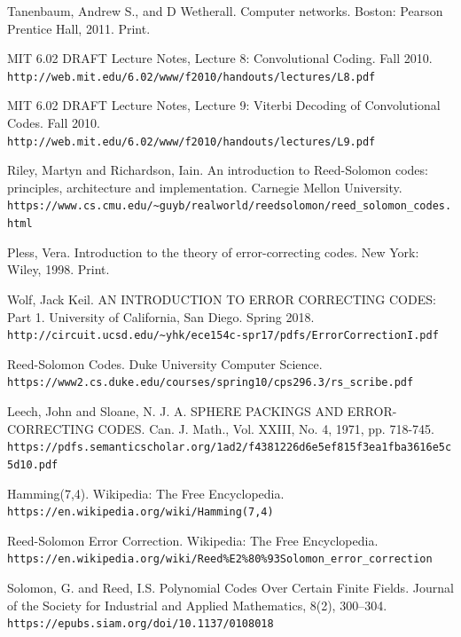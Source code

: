 \documentclass[12pt]{article}
\begin{document}
\begin{thebibliography}{9}

Tanenbaum, Andrew S., and D Wetherall. Computer networks. Boston: Pearson Prentice Hall, 2011. Print.
 
MIT 6.02 DRAFT Lecture Notes, Lecture 8: Convolutional Coding. Fall 2010. 
\\\texttt{http://web.mit.edu/6.02/www/f2010/handouts/lectures/L8.pdf}

MIT 6.02 DRAFT Lecture Notes, Lecture 9: Viterbi Decoding of Convolutional Codes. Fall 2010.
\\\texttt{http://web.mit.edu/6.02/www/f2010/handouts/lectures/L9.pdf}

Riley, Martyn and Richardson, Iain. An introduction to Reed-Solomon codes: principles, architecture and implementation. Carnegie Mellon University.
\\\texttt{https://www.cs.cmu.edu/\textasciitilde{}guyb/realworld/reedsolomon/reed\_solomon\_codes.html}

Pless, Vera. Introduction to the theory of error-correcting codes. New York: Wiley, 1998. Print.

Wolf, Jack Keil. AN INTRODUCTION TO ERROR CORRECTING CODES: Part 1. University of California, San Diego. Spring 2018. \texttt{http://circuit.ucsd.edu/\textasciitilde{}yhk/ece154c-spr17/pdfs/ErrorCorrectionI.pdf}

Reed-Solomon Codes. Duke University Computer Science. \texttt{https://www2.cs.duke.edu/courses/spring10/cps296.3/rs\_scribe.pdf
}

Leech, John and Sloane, N. J. A. SPHERE PACKINGS AND ERROR-CORRECTING CODES. Can. J. Math., Vol. XXIII, No. 4, 1971, pp. 718-745. \texttt{https://pdfs.semanticscholar.org/1ad2/f4381226d6e5ef815f3ea1fba3616e5c5d10.pdf}

Hamming(7,4). Wikipedia: The Free Encyclopedia. \texttt{https://en.wikipedia.org/wiki/Hamming(7,4)}

Reed-Solomon Error Correction. Wikipedia: The Free Encyclopedia. \texttt{https://en.wikipedia.org/wiki/Reed\%E2\%80\%93Solomon\_error\_correction
}

Solomon, G. and Reed, I.S. Polynomial Codes Over Certain Finite Fields. Journal of the Society for Industrial and Applied Mathematics, 8(2), 300–304. \texttt{https://epubs.siam.org/doi/10.1137/0108018}

\end{thebibliography}
\end{document}
